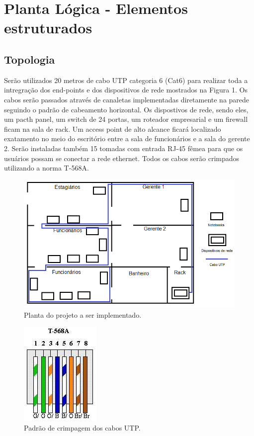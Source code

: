 \documentclass[	DIV=calc,%
							paper=a4,%
							fontsize=12pt,%
							onecolumn]{scrartcl}	 					%
\begin{document}
\section{Planta Lógica - Elementos estruturados}



\subsection{Topologia}

Serão utilizados 20 metros de cabo UTP categoria 6 (Cat6) para realizar toda a intregração dos end-points e dos dispositivos de rede mostrados na Figura 1. Os cabos serão passados através de canaletas implementadas diretamente na parede seguindo o padrão de cabeamento horizontal. Os dispostivos de rede, sendo eles, um pacth panel, um switch de 24 portas, um roteador empresarial e um firewall ficam na sala de rack. Um access point de alto alcance ficará localizado exatamento no meio do escritório entre a sala de funcionários e a sala do gerente 2. Serão instaladas também 15 tomadas com entrada RJ-45 fêmea para que os usuários possam se conectar a rede ethernet. Todos os cabos serão crimpados utilizando a norma T-568A.

\begin{figure}[h]
	\centering
	\flushright
	\includegraphics[scale=0.6]{planta}
	\caption{Planta do projeto a ser implementado.}
	\label{fplanta}
\end{figure}

\begin{figure}[h]
	\centering
	\includegraphics[scale=0.6]{index}
	\caption{Padrão de crimpagem dos cabos UTP.}
	\label{T658A}
\end{figure}
\end{document}
